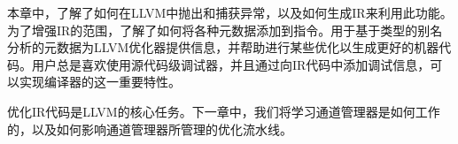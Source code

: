 本章中，了解了如何在LLVM中抛出和捕获异常，以及如何生成IR来利用此功能。为了增强IR的范围，了解了如何将各种元数据添加到指令。用于基于类型的别名分析的元数据为LLVM优化器提供信息，并帮助进行某些优化以生成更好的机器代码。用户总是喜欢使用源代码级调试器，并且通过向IR代码中添加调试信息，可以实现编译器的这一重要特性。

优化IR代码是LLVM的核心任务。下一章中，我们将学习通道管理器是如何工作的，以及如何影响通道管理器所管理的优化流水线。